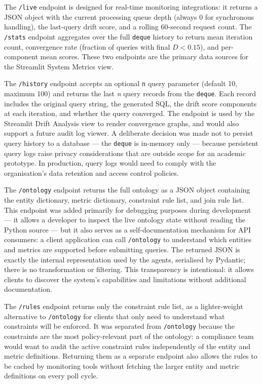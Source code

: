 \documentclass[12pt,a4paper]{report}
\begin{document}
The \texttt{/live} endpoint is designed for real-time monitoring integrations: it returns a JSON object with the current processing queue depth (always 0 for synchronous handling), the last-query drift score, and a rolling 60-second request count. The \texttt{/stats} endpoint aggregates over the full \texttt{deque} history to return mean iteration count, convergence rate (fraction of queries with final $D < 0.15$), and per-component mean scores. These two endpoints are the primary data sources for the Streamlit System Metrics view.

The \texttt{/history} endpoint accepts an optional \texttt{n} query parameter (default 10, maximum 100) and returns the last \textit{n} query records from the \texttt{deque}. Each record includes the original query string, the generated SQL, the drift score components at each iteration, and whether the query converged. The endpoint is used by the Streamlit Drift Analysis view to render convergence graphs, and would also support a future audit log viewer. A deliberate decision was made not to persist query history to a database — the \texttt{deque} is in-memory only — because persistent query logs raise privacy considerations that are outside scope for an academic prototype. In production, query logs would need to comply with the organisation's data retention and access control policies.

The \texttt{/ontology} endpoint returns the full ontology as a JSON object containing the entity dictionary, metric dictionary, constraint rule list, and join rule list. This endpoint was added primarily for debugging purposes during development — it allows a developer to inspect the live ontology state without reading the Python source — but it also serves as a self-documentation mechanism for API consumers: a client application can call \texttt{/ontology} to understand which entities and metrics are supported before submitting queries. The returned JSON is exactly the internal representation used by the agents, serialised by Pydantic; there is no transformation or filtering. This transparency is intentional: it allows clients to discover the system's capabilities and limitations without additional documentation.

The \texttt{/rules} endpoint returns only the constraint rule list, as a lighter-weight alternative to \texttt{/ontology} for clients that only need to understand what constraints will be enforced. It was separated from \texttt{/ontology} because the constraints are the most policy-relevant part of the ontology: a compliance team would want to audit the active constraint rules independently of the entity and metric definitions. Returning them as a separate endpoint also allows the rules to be cached by monitoring tools without fetching the larger entity and metric definitions on every poll cycle.
\end{document}
